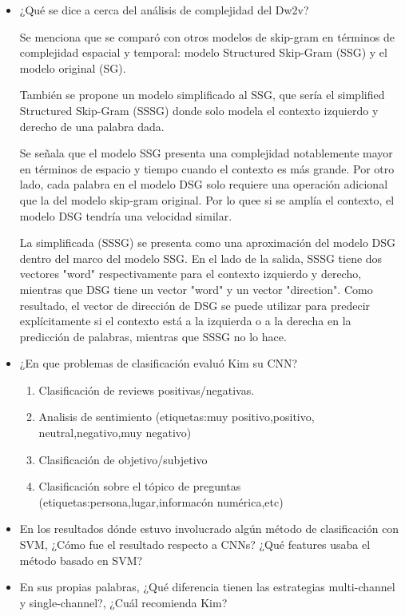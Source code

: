 \documentclass[letter, 11pt, twoside]{report}
\begin{document}
\begin{itemize}
  \item ¿Qué se dice a cerca del análisis de complejidad del Dw2v?
  
  Se menciona que se comparó con otros modelos de skip-gram en términos de complejidad espacial y temporal: modelo Structured Skip-Gram (SSG) y el modelo original (SG).

  También se propone un modelo simplificado al SSG, que sería el simplified Structured Skip-Gram (SSSG) donde solo modela el contexto izquierdo y derecho de una palabra dada.
  
  Se señala que el modelo SSG presenta una complejidad notablemente mayor en términos de espacio y tiempo cuando el contexto es más grande. 
  Por otro lado, cada palabra en el modelo DSG solo requiere una operación adicional que la del modelo skip-gram original. Por lo quee si se amplía el contexto, el modelo DSG tendría una velocidad similar.

   La simplificada (SSSG) se presenta como una aproximación del modelo DSG dentro del marco del modelo SSG. En el lado de la salida, SSSG tiene dos vectores "word" respectivamente para el contexto izquierdo y derecho, mientras que DSG tiene un vector "word" y un vector "direction". Como resultado, el vector de dirección de DSG se puede utilizar para predecir explícitamente si el contexto está a la izquierda o a la derecha en la predicción de palabras, mientras que SSSG no lo hace.

  \item ¿En que problemas de clasificación evaluó Kim su CNN?
  \begin{enumerate}
    \item Clasificación de reviews positivas/negativas.
    \item Analisis de sentimiento (etiquetas:muy positivo,positivo, neutral,negativo,muy negativo)
    \item Clasificación de objetivo/subjetivo
    \item Clasificación sobre el tópico de preguntas (etiquetas:persona,lugar,informacón numérica,etc)
  \end{enumerate}
  
  \item En los resultados dónde estuvo involucrado algún método de clasificación con SVM, ¿Cómo fue el resultado respecto a CNNs? ¿Qué features usaba el método basado en SVM?
  
  \item  En sus propias palabras, ¿Qué diferencia tienen las estrategias multi-channel y single-channel?, ¿Cuál recomienda Kim? 
  


\end{itemize}
\end{document}
